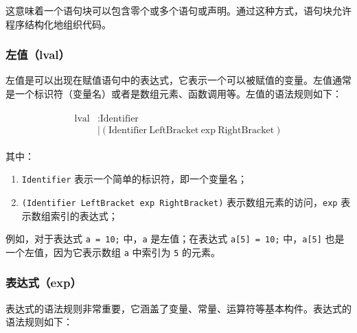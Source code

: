 \documentclass[../main.tex]{subfiles}
\begin{document}
这意味着一个语句块可以包含零个或多个语句或声明。通过这种方式，语句块允许程序结构化地组织代码。

\subsubsection{左值（lval）}

左值是可以出现在赋值语句中的表达式，它表示一个可以被赋值的变量。左值通常是一个标识符（变量名）或者是数组元素、函数调用等。左值的语法规则如下：

\begin{gather*}
	\begin{aligned}
		\text{lval} & \colon \text{Identifier}                                                         \\
		            & \mid (\text{Identifier} \ \text{LeftBracket} \ \text{exp} \ \text{RightBracket})
	\end{aligned}
\end{gather*}

其中：

\begin{enumerate}
	\item \texttt{Identifier} 表示一个简单的标识符，即一个变量名；
	\item \texttt{(Identifier LeftBracket exp RightBracket)} 表示数组元素的访问，\texttt{exp} 表示数组索引的表达式；
\end{enumerate}

例如，对于表达式 \texttt{a = 10;} 中，\texttt{a} 是左值；在表达式 \texttt{a[5] = 10;} 中，\texttt{a[5]} 也是一个左值，因为它表示数组 \texttt{a} 中索引为 \texttt{5} 的元素。


\subsubsection{表达式（exp）}

表达式的语法规则非常重要，它涵盖了变量、常量、运算符等基本构件。表达式的语法规则如下：
\end{document}
